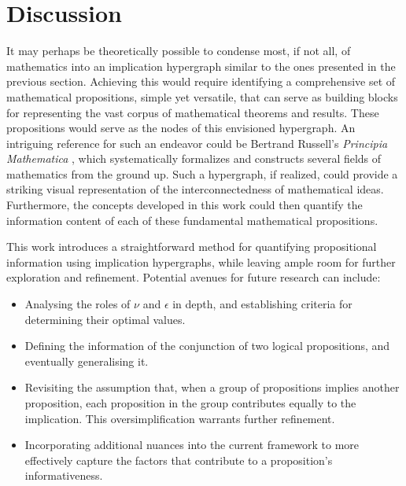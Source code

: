 \documentclass[11pt]{article}
\theoremstyle{definition}
\theoremstyle{plain}
\theoremstyle{remark}
\begin{document}
\section{Discussion}
It may perhaps be theoretically possible to condense most, if not all, of mathematics into an implication hypergraph similar to the ones presented in the previous section. Achieving this would require identifying a comprehensive set of mathematical propositions, simple yet versatile, that can serve as building blocks for representing the vast corpus of mathematical theorems and results. These propositions would serve as the nodes of this envisioned hypergraph. An intriguing reference for such an endeavor could be Bertrand Russell's \emph{Principia Mathematica} \cite{Russell1910-RUSPMV}, which systematically formalizes and constructs several fields of mathematics from the ground up. Such a hypergraph, if realized, could provide a striking visual representation of the interconnectedness of mathematical ideas. Furthermore, the concepts developed in this work could then quantify the information content of each of these fundamental mathematical propositions.

This work introduces a straightforward method for quantifying propositional information using implication hypergraphs, while leaving ample room for further exploration and refinement. Potential avenues for future research can include:
\begin{itemize}  
    \item Analysing the roles of \( \nu \) and \( \epsilon \) in depth, and establishing criteria for determining their optimal values. 
    \item Defining the information of the conjunction of two logical propositions, and eventually generalising it.  
    \item Revisiting the assumption that, when a group of propositions implies another proposition, each proposition in the group contributes equally to the implication. This oversimplification warrants further refinement.  
    \item Incorporating additional nuances into the current framework to more effectively capture the factors that contribute to a proposition's informativeness.
 
\end{itemize}  
\end{document}
